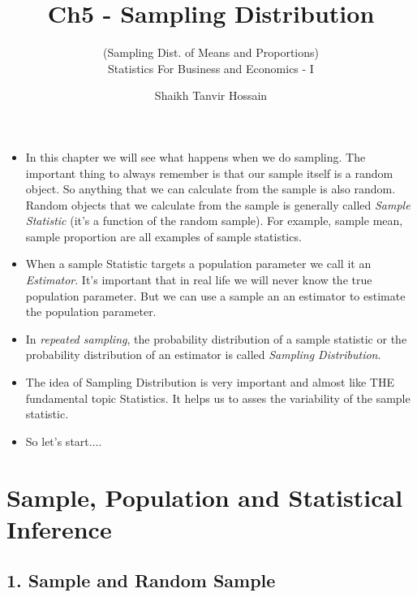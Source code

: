 \documentclass[8pt, usepdftitle=false]{beamer}
\title{\LARGE Ch5 - Sampling Distribution}
\subtitle{{\fontsize{10}{10}\selectfont\color{gray!50!balck} 
(Sampling Dist. of Means and Proportions)} 
\\\vspace*{.2cm} Statistics For Business and Economics - I}
\author{Shaikh Tanvir Hossain\vspace*{-.4cm}}
\institute{ East West University, Dhaka\\ Last Updated \today}
\date{\vspace{-5pt}}
\begin{document}



\begin{frame}[allowframebreaks]{}

\begin{itemize}
\item In this chapter we will see what happens when we do sampling. The important thing to always remember is that our sample itself is a random object. So anything that we can calculate from the sample is also random. Random objects that we calculate from the sample is generally called \emph{Sample Statistic} (it's a function of the random sample). For example, sample mean, sample proportion are all examples of sample statistics. 

\item When a sample Statistic targets a population parameter we call it an \emph{Estimator}. It's important that in real life we will never know the true population parameter. But we can use a sample an an estimator to estimate the population parameter. 


\item In \emph{repeated sampling}, the probability distribution of a sample statistic or the probability distribution of an estimator is called \emph{Sampling Distribution}. 

\item  The idea of Sampling Distribution is very important and almost like THE fundamental topic Statistics. It helps us to asses the variability of the sample statistic. 


\item So let's start...\faWalking \faWalking \faWalking.

\end{itemize}

\end{frame}



\section{Sample, Population and Statistical Inference}
\frame{\sectionpage}


\subsection{1. Sample and Random Sample}
\frame{\subsectionpage}
\end{document}
